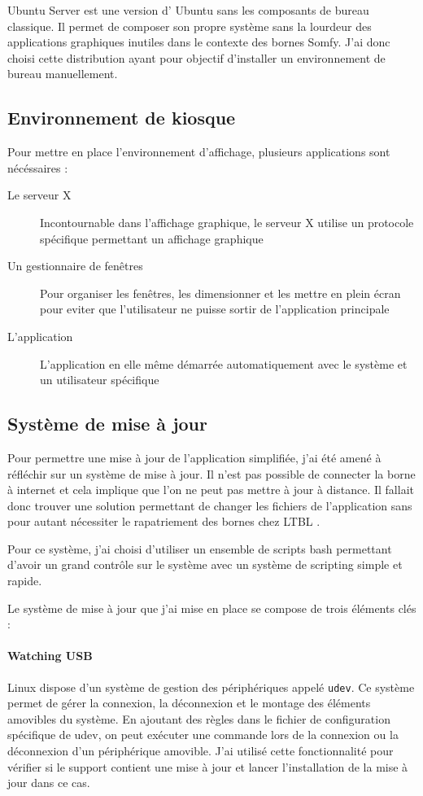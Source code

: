 Ubuntu Server est une version d’ Ubuntu sans les composants de bureau classique.
Il permet de composer son propre système sans la lourdeur des applications graphiques inutiles dans le contexte des bornes Somfy.
J'ai donc choisi cette distribution ayant pour objectif d'installer un environnement de bureau manuellement.

\subsection{Environnement de kiosque}

Pour mettre en place l'environnement d'affichage, plusieurs applications sont nécéssaires :

\begin{description}
    \item[Le serveur X] Incontournable dans l'affichage graphique, le serveur X utilise un protocole spécifique permettant un affichage graphique
    \item[Un gestionnaire de fenêtres] Pour organiser les fenêtres, les dimensionner et les mettre en plein écran pour eviter que l'utilisateur ne puisse sortir de l'application principale
    \item[L'application] L'application en elle même démarrée automatiquement avec le système et un utilisateur spécifique
\end{description}

\subsection{Système de mise à jour}

Pour permettre une mise à jour de l'application simplifiée, j'ai été amené à réfléchir sur un système de mise à jour.
Il n'est pas possible de connecter la borne à internet et cela implique que l'on ne peut pas mettre à jour à distance.
Il fallait donc trouver une solution permettant de changer les fichiers de l'application sans pour autant nécessiter le rapatriement des bornes chez LTBL .

Pour ce système, j'ai choisi d'utiliser un ensemble de scripts bash permettant d'avoir un grand contrôle sur le système avec un système de scripting simple et rapide.

\clearpage

Le système de mise à jour que j'ai mise en place se compose de trois éléments clés :

\paragraph{Watching USB} Linux dispose d'un système de gestion des périphériques appelé \texttt{udev}.
Ce système permet de gérer la connexion, la déconnexion et le montage des éléments amovibles du système.
En ajoutant des règles dans le fichier de configuration spécifique de udev, on peut exécuter une commande lors de la connexion ou la déconnexion d'un périphérique amovible.
J'ai utilisé cette fonctionnalité pour vérifier si le support contient une mise à jour et lancer l'installation de la mise à jour dans ce cas.


